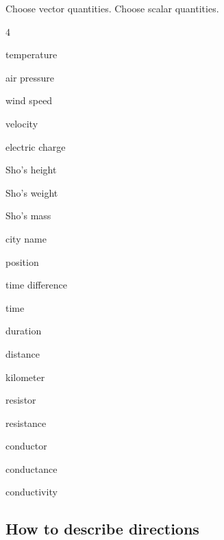 \documentclass[11pt,pdfa,lastpage]{MishoNote}
\begin{document}
\begin{quizzes}
  \Quiz[S] Choose vector quantities. Choose scalar quantities.
  \begin{menumerate}[labelsep=0em,labelwidth=0em,itemindent=1em,label={},leftmargin=0.3em]{4}
    \item temperature
    \item air pressure
    \item wind speed
    \item velocity
    \item electric charge
    \item Sho's height
    \item Sho's weight
    \item Sho's mass
    \item city name
    \item position
    \item time difference
    \item time
    \item duration
    \item distance
    \item kilometer
    \item resistor
    \item resistance
    \item conductor
    \item conductance
    \item conductivity
  \end{menumerate}
\end{quizzes}

\newpage
\subsection{How to describe directions}
\end{document}
